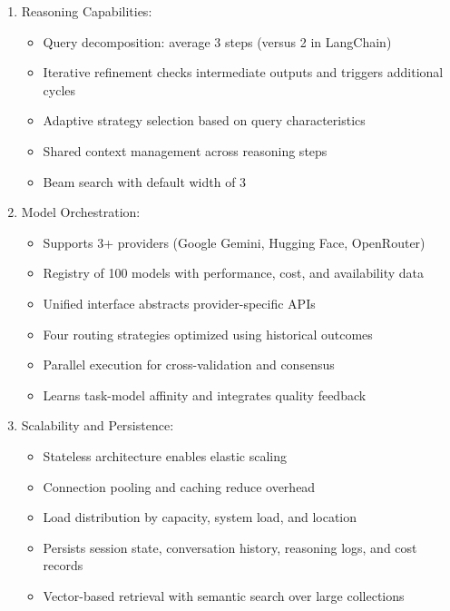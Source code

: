 \documentclass[final,5p,times,twocolumn,authoryear,draft]{elsarticle}
\begin{document}
\begin{enumerate}
\item{Reasoning Capabilities:}
\begin{itemize}
    \item Query decomposition: average 3 steps (versus 2 in LangChain)
    \item Iterative refinement checks intermediate outputs and triggers additional cycles
    \item Adaptive strategy selection based on query characteristics
    \item Shared context management across reasoning steps
    \item Beam search with default width of 3
\end{itemize}

\item{Model Orchestration:}
\begin{itemize}
    \item Supports 3+ providers (Google Gemini, Hugging Face, OpenRouter)
    \item Registry of 100 models with performance, cost, and availability data
    \item Unified interface abstracts provider-specific APIs
    \item Four routing strategies optimized using historical outcomes
    \item Parallel execution for cross-validation and consensus
    \item Learns task-model affinity and integrates quality feedback
\end{itemize}

\item{Scalability and Persistence:}
\begin{itemize}
    \item Stateless architecture enables elastic scaling
    \item Connection pooling and caching reduce overhead
    \item Load distribution by capacity, system load, and location
    \item Persists session state, conversation history, reasoning logs, and cost records
    \item Vector-based retrieval with semantic search over large collections
\end{itemize}
   


\end{enumerate}
\end{document}
